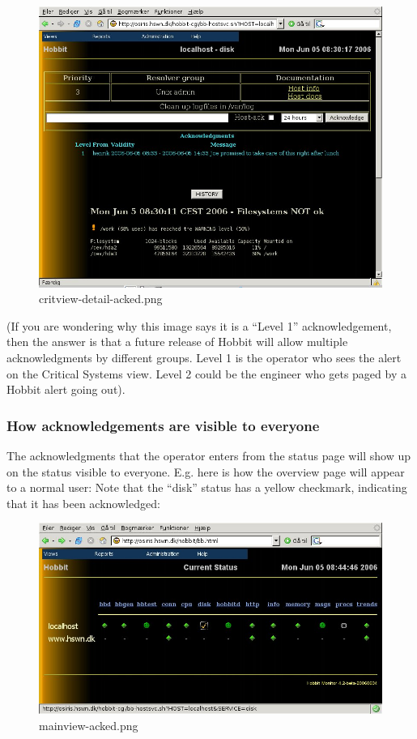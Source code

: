 \begin{figure} \centering \caption{critview-detail-acked.png}\label{critview-detail-acked.png}
\includegraphics[scale=0.5]{./critview-detail-acked.png} 
\end{figure}

 (If you are wondering why this image says it is a ``Level 1''
 acknowledgement, then the answer is that a future release of Hobbit
 will allow multiple acknowledgments by different groups. Level 1 is
 the operator who sees the alert on the Critical Systems view. Level 2
 could be the engineer who gets paged by a Hobbit alert going
 out).

\subsubsection{How acknowledgements are visible to everyone}


 The acknowledgments that the operator enters from the status page
 will show up on the status visible to everyone. E.g. here is how the
 overview page will appear to a normal user: Note that the ``disk''
 status has a yellow checkmark, indicating that it has been
 acknowledged: 

\begin{figure} \centering \caption{mainview-acked.png}\label{mainview-acked.png}
\includegraphics[scale=0.5]{./mainview-acked.png} 
\end{figure}

